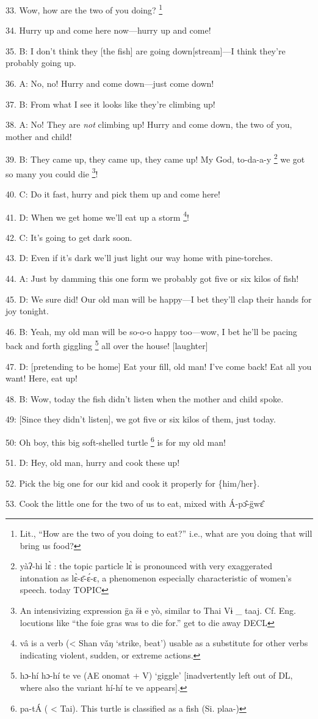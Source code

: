 33. Wow, how are the two of you doing? \footnote{Lit., ``How are the two of you doing to eat?'' i.e., what are you doing that will bring us food?}

34. Hurry up and come here now---hurry up and come!

35. B: I don't think they [the fish] are going down[stream]---I think they're probably
going up.

36. A: No, no! Hurry and come down---just come down!

37. B: From what I see it looks like they're climbing up!

38. A: No! They are \textit{not} climbing up! Hurry and come down, the two of you,
mother and child!

39. B: They came up, they came up, they came up! My God, to-da-a-y \footnote{yàʔ-hi lɛ̀ : the topic particle lɛ̀ is pronounced with very exaggerated intonation as lɛ̀-ɛ̄-ɛ́-ɛ, a phenomenon especially characteristic of women's speech.  today  TOPIC} we got
so many you could die \footnote{An intensivizing expression g̈a  šɨ  e  yò, similar to Thai Vɨ \_ taaj. Cf. Eng. locutions like ``the foie gras was to die for.''  get to die away DECL}!

40. C: Do it fast, hurry and pick them up and come here!

41. D: When we get home we'll eat up a storm \footnote{vâ is a verb (< Shan vǎŋ `strike, beat') usable as a substitute for other verbs indicating violent, sudden, or extreme actions.}!

42. C: It's going to get dark soon.

43. D: Even if it's dark we'll just light our way home with pine-torches.

44. A: Just by damming this one form we probably got five or six kilos of fish!

45. D: We sure did! Our old man will be happy---I bet they'll clap their hands
for joy tonight.

46. B: Yeah, my old man will be so-o-o happy too---wow, I bet he'll be pacing back
and forth giggling \footnote{hɔ-hí hɔ-hí te ve (AE onomat + V) `giggle' [inadvertently left out of DL, where also the variant hí-hí te ve appears].} all over the house! [laughter]

47. D: [pretending to be home] Eat your fill, old man! I've come back! Eat all
you want! Here, eat up!

48. B: Wow, today the fish didn't listen when the mother and child spoke.

49: [Since they didn't listen], we got five or six kilos of them, just today.

50: Oh boy, this big soft-shelled turtle \footnote{pa-tÁ ( < Tai). This turtle is classified as a fish (Si. plaa-)} is for my old man!

51. D: Hey, old man, hurry and cook these up!

52. Pick the big one for our kid and cook it properly for \{him/her\}.

53. Cook the little one for the two of us to eat, mixed with Á-pɔ̂-g̈wɛ̂
